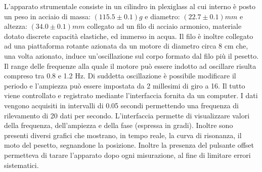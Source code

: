 L’apparato strumentale consiste in un cilindro in plexiglass al cui interno è posto un peso in acciaio di massa: $(115.5 \pm 0.1) g$
 e diametro: $(22.7 \pm 0.1)mm$ e altezza: $(34.0 \pm 0.1)mm$ collegato ad un filo di acciaio armonico, materiale dotato discrete
 capacità elastiche, ed immerso in acqua. Il filo è inoltre collegato ad una piattaforma rotante azionata da un motore di
 diametro circa 8 cm che, una volta azionato, induce un’oscillazione sul corpo formato dal filo più il pesetto. Il range delle
 frequenze alla quale il motore può essere indotto ad oscillare risulta compreso tra 0.8 e 1.2 Hz. Di suddetta oscillazione è
 possibile modificare il periodo e l’ampiezza può essere impostata da 2 millesimi di giro a 16. Il tutto viene controllato e
 registrato mediante l’interfaccia fornita da un computer.
 I dati vengono acquisiti in intervalli di 0.05 secondi permettendo una frequenza di rilevamento di 20 dati per secondo.
 L’interfaccia permette di visualizzare valori della frequenza, dell’ampiezza e della fase (espressa in gradi). Inoltre sono presenti
 diversi grafici che mostrano, in tempo reale, la curva di risonanza, il moto del pesetto, segnandone la posizione. Inoltre la
 presenza del pulsante offset permetteva di tarare l’apparato dopo ogni misurazione, al fine di limitare errori sistematici.


